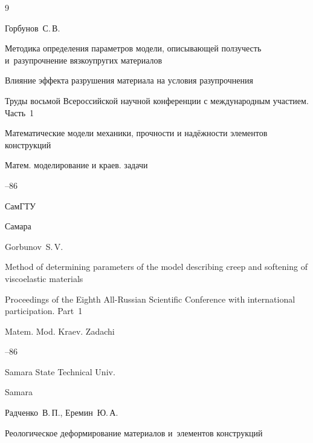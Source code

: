 










\begin{thebibliography}{9}




\by Горбунов~С.\,В.

\paper Методика определения параметров модели, описывающей ползучесть и~разупрочнение вязкоупругих материалов

\paper Влияние эффекта разрушения материала на условия разупрочнения

\inbook Труды восьмой Всероссийской научной конференции с международным участием. \rm Часть~1

\bookinfo Математические модели механики, прочности и надёжности элементов конструкций

\serial Матем. моделирование и краев. задачи


--86

\publ СамГТУ

\publaddr Самара

\misctransl

\by Gorbunov~S.\,V.

\paper Method of determining parameters of the model describing creep and softening of viscoelastic materials

\inbook Proceedings of the Eighth All-Russian Scientific Conference with international participation. \rm Part~1

\serial Matem. Mod. Kraev. Zadachi


--86

\publ Samara State Technical Univ.

\publaddr Samara






\by Радченко~В.\,П., Еремин~Ю.\,А.

\book Реологическое деформирование материалов и~элементов конструкций



\end{thebibliography}
